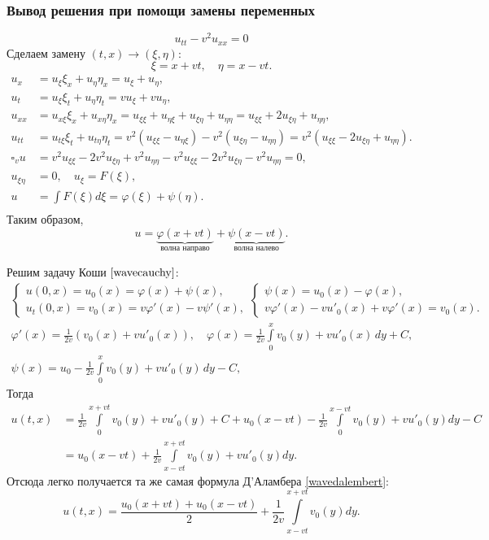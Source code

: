 \subsubsection{Вывод решения при помощи замены переменных}
$$u_{tt} - v^2 u_{xx} = 0$$
Сделаем замену $(t, x) \to (\xi, \eta)$:
$$ \xi = x + vt, \quad \eta = x - vt.$$
\begin{align*}
	u_x &= u_{\xi} \xi_x + u_{\eta} \eta_x = u_{\xi} + u_{\eta}, \\
	u_t &=  u_{\xi} \xi_t + u_{\eta} \eta_t = v u_{\xi} + v u_{\eta}, \\
	u_{xx} &= u_{x\xi} \xi_x + u_{x\eta} \eta_x = u_{\xi\xi} + u_{\eta\xi} + u_{\xi\eta} + u_{\eta\eta}  =  u_{\xi\xi} + 2 u_{\xi\eta} + u_{\eta\eta}, \\
	u_{tt} &= u_{t\xi} \xi_t + u_{t\eta} \eta_t = v^2 (u_{\xi\xi} - u_{\eta\xi}) - v^2 (u_{\xi\eta} - u_{\eta\eta}) = v^2 (u_{\xi\xi} - 2u_{\xi\eta} + u_{\eta\eta}). \\
	\square_v u &= v^2 u_{\xi\xi} - 2v^2 u_{\xi\eta} + v^2 u_{\eta\eta} - v^2 u_{\xi\xi} - 2v^2 u_{\xi\eta} - v^2 u_{\eta\eta} = 0, \\
	u_{\xi\eta} &= 0, \quad u_{\xi} = F(\xi), \\
	u &= \int F(\xi) d\xi = \varphi (\xi) + \psi (\eta). \\
\end{align*}
Таким образом,
$$ u = \underbrace {\varphi (x+vt)}_{\text{волна направо}} + \underbrace {\psi (x-vt)}_{\text{волна налево}}.$$

Решим задачу Коши $\eqref{wavecauchy}$:
\begin{gather*}
	\begin{cases}
		u(0,x) = u_0(x) = \varphi(x) + \psi(x), \\
		u_t(0,x) = v_0(x) = v \varphi'(x) - v \psi'(x),
	\end{cases}
	\begin{cases}
		\psi(x) = u_0(x) - \varphi(x), \\
		v \varphi'(x)  - vu'_0(x) + v \varphi'(x) = v_0(x).
	\end{cases} \\
	\varphi'(x) = \frac {1} {2v} (v_0(x) + vu'_0(x)), \quad 	\varphi(x) = \frac {1} {2v} \int \limits_0^x v_0(y) + vu'_0(x) \,dy + C, \\
	\psi(x) = u_0 - \frac {1} {2v} \int \limits_0^x v_0(y) + vu'_0(y) \,dy - C,
\end{gather*}
Тогда
\begin{align*}
	u(t,x) &= \frac {1} {2v} \int \limits_0^{x+vt} v_0(y) + vu'_0(y) + C + u_0(x-vt) -  \frac {1} {2v} \int \limits_0^{x-vt} v_0(y) + vu'_0(y) dy - C \\
		&= u_0(x-vt) + \frac {1} {2v} \int \limits_{x-vt}^{x+vt} v_0(y) + v u'_0(y) dy.
\end{align*}
Отсюда легко получается та же самая формула Д'Аламбера \eqref{wavedalembert}:
\begin{equation*}
	u(t,x) = \frac {u_0(x+vt) + u_0(x-vt)} {2} + \frac {1} {2v} \int \limits_{x-vt}^{x+vt} v_0(y)dy.
\end{equation*}

